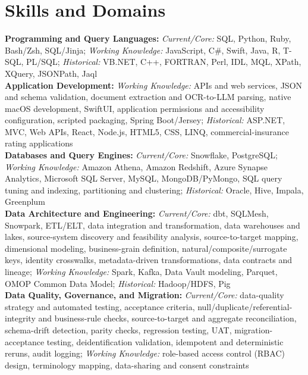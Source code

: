 \section{Skills and Domains}
\label{sec:skills_and_domains}

\textbf{Programming and Query Languages:} \textit{Current/Core:} SQL, Python, Ruby, Bash/Zsh, SQL/Jinja; \textit{Working Knowledge:} JavaScript, C\#, Swift, Java, R, T-SQL, PL/SQL; \textit{Historical:} VB.NET, C++, FORTRAN, Perl, IDL, MQL, XPath, XQuery, JSONPath, Jaql\\
\textbf{Application Development:} \textit{Working Knowledge:} APIs and web services, JSON and schema validation, document extraction and OCR-to-LLM parsing, native macOS development, SwiftUI, application permissions and accessibility configuration, scripted packaging, Spring Boot/Jersey; \textit{Historical:} ASP.NET, MVC, Web APIs, React, Node.js, HTML5, CSS, LINQ, commercial-insurance rating applications\\
\textbf{Databases and Query Engines:} \textit{Current/Core:} Snowflake, PostgreSQL; \textit{Working Knowledge:} Amazon Athena, Amazon Redshift, Azure Synapse Analytics, Microsoft SQL Server, MySQL, MongoDB/PyMongo, SQL query tuning and indexing, partitioning and clustering; \textit{Historical:} Oracle, Hive, Impala, Greenplum\\
\textbf{Data Architecture and Engineering:} \textit{Current/Core:} dbt, SQLMesh, Snowpark, ETL/ELT, data integration and transformation, data warehouses and lakes, source-system discovery and feasibility analysis, source-to-target mapping, dimensional modeling, business-grain definition, natural/composite/surrogate keys, identity crosswalks, metadata-driven transformations, data contracts and lineage; \textit{Working Knowledge:} Spark, Kafka, Data Vault modeling, Parquet, OMOP Common Data Model; \textit{Historical:} Hadoop/HDFS, Pig\\
\textbf{Data Quality, Governance, and Migration:} \textit{Current/Core:} data-quality strategy and automated testing, acceptance criteria, null/duplicate/referential-integrity and business-rule checks, source-to-target and aggregate reconciliation, schema-drift detection, parity checks, regression testing, UAT, migration-acceptance testing, deidentification validation, idempotent and deterministic reruns, audit logging; \textit{Working Knowledge:} role-based access control (RBAC) design, terminology mapping, data-sharing and consent constraints\\
